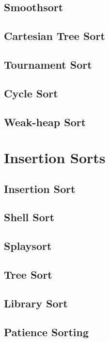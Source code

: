			\subsection{Smoothsort}

			\subsection{Cartesian Tree Sort}

			\subsection{Tournament Sort}

			\subsection{Cycle Sort}

			\subsection{Weak-heap Sort}

		\section{Insertion Sorts}
			\subsection{Insertion Sort}

			\subsection{Shell Sort}

			\subsection{Splaysort}

			\subsection{Tree Sort}

			\subsection{Library Sort}

			\subsection{Patience Sorting}


